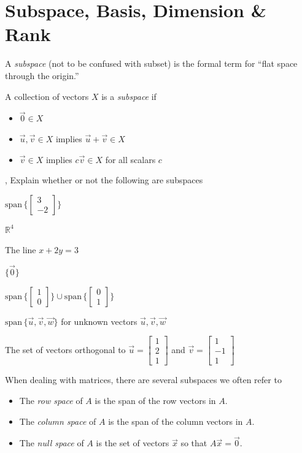 \documentclass{article}
\newcommand{\R}{\mathbb{R}}
\renewcommand{\span}{\mathrm{span}\,}
\newcommand{\mat}[1]{\begin{bmatrix}#1\end{bmatrix}}
\begin{document}
\newpage
\section*{Subspace, Basis, Dimension \& Rank }

\begin{Def}
A \emph{subspace} (not to be confused with subset) is the formal term for ``flat
space through the origin.''

A collection of vectors $X$ is a \emph{subspace} if
\begin{itemize}
	\item $\vec 0\in X$
	\item $\vec u,\vec v\in X$ implies $\vec u+\vec v\in X$
	\item $\vec v\in X$ implies $c\vec v\in X$ for all scalars $c$
\end{itemize}
\vspace{-.3in}
\end{Def}

\sep
Explain whether or not the following are subspaces
\begin{Enum}
	\item $\span\{\mat{3\\-2}\}$
	\item $\R^4$
	\item The line $x+2y=3$
	\item $\{\vec 0\}$
	\item $\span \{\mat{1\\0}\}\cup \span\{\mat{0\\1}\}$
	\item $\span \{\vec u,\vec v,\vec w\}$ for unknown vectors $\vec u,\vec v,\vec w$
	\item The set of vectors orthogonal to $\vec u=\mat{1\\2\\1}$ and $\vec v=\mat{1\\-1\\1}$
\end{Enum}

When dealing with matrices, there are several subspaces we often refer to 
\begin{itemize}
	\item The \emph{row space} of $A$ is the span of the row vectors in $A$.
	\item The \emph{column space} of $A$ is the span of the column vectors in $A$.
	\item The \emph{null space} of $A$ is the set of vectors $\vec x$ so that 
		$A\vec x=\vec 0$.
\end{itemize}
\end{document}
